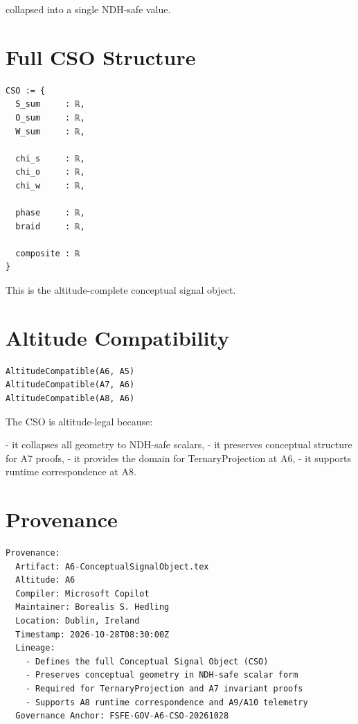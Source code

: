 \documentclass[11pt]{article}
\begin{document}
collapsed into a single NDH-safe value.

\newpage


\section{Full CSO Structure}

\begin{verbatim}
CSO := {
  S_sum     : ℝ,
  O_sum     : ℝ,
  W_sum     : ℝ,

  chi_s     : ℝ,
  chi_o     : ℝ,
  chi_w     : ℝ,

  phase     : ℝ,
  braid     : ℝ,

  composite : ℝ
}
\end{verbatim}

This is the altitude-complete conceptual signal object.

\newpage


\section{Altitude Compatibility}

\begin{verbatim}
AltitudeCompatible(A6, A5)
AltitudeCompatible(A7, A6)
AltitudeCompatible(A8, A6)
\end{verbatim}

The CSO is altitude-legal because:

- it collapses all geometry to NDH-safe scalars,
- it preserves conceptual structure for A7 proofs,
- it provides the domain for TernaryProjection at A6,
- it supports runtime correspondence at A8.

\newpage


\section*{Provenance}

\begin{verbatim}
Provenance:
  Artifact: A6-ConceptualSignalObject.tex
  Altitude: A6
  Compiler: Microsoft Copilot
  Maintainer: Borealis S. Hedling
  Location: Dublin, Ireland
  Timestamp: 2026-10-28T08:30:00Z
  Lineage:
    - Defines the full Conceptual Signal Object (CSO)
    - Preserves conceptual geometry in NDH-safe scalar form
    - Required for TernaryProjection and A7 invariant proofs
    - Supports A8 runtime correspondence and A9/A10 telemetry
  Governance Anchor: FSFE-GOV-A6-CSO-20261028
\end{verbatim}
\end{document}
